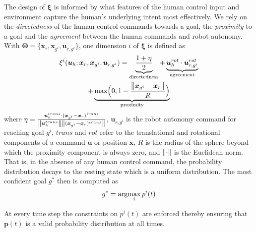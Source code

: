 The design of $\boldsymbol{\xi}$ is informed by what features of the human control input and environment capture the human's underlying intent most effectively. We rely on the \textit{directedness} of the human control commands towards a goal, the \textit{proximity} to a goal and the \textit{agreement} between the human commands and robot autonomy. 
With $\boldsymbol{\Theta} = \{\boldsymbol{x}_r, \boldsymbol{x}_{g^i}, \boldsymbol{u}_{r, g^i}\}$, one dimension $i$ of $\boldsymbol{\xi}$ is defined as 
\begin{multline*}
\xi^i(\boldsymbol{u}_h;\boldsymbol{x}_r, \boldsymbol{x}_{g^i}, \boldsymbol{u}_{r, g^i}) = \underbrace{\frac{1 + \eta}{2}}_{\text{directedness}} + \underbrace{\boldsymbol{u}_{h}^{rot}\cdot\boldsymbol{u}_{r,g^i}^{rot}}_{\text{agreement}}
\\+ \underbrace{\text{max}\Big(0, 1-\frac{\left\lVert\boldsymbol{x}_{g^i} - \boldsymbol{x}_r\right\rVert}{R}\Big)}_{\text{proximity}}
\end{multline*}
where  $\eta = \frac{\boldsymbol{u}_h^{trans}\cdot(\boldsymbol{x}_{g^i} - \boldsymbol{x}_r)^{trans}}{\left\lVert\boldsymbol{u}_h^{trans}\right\rVert\left\lVert(\boldsymbol{x}_{g^i} - \boldsymbol{x}_r)^{trans}\right\rVert}$, $\boldsymbol{u}_{r,g^i}$ is the robot autonomy command for reaching goal $g^i$, $trans$ and $rot$ refer to the translational and rotational components of a command $\boldsymbol{u}$ or position $\boldsymbol{x}$,  $R$ is the radius of the sphere beyond which the proximity component is always zero, and $\left\lVert\cdot\right\rVert$ is the Euclidean norm. That is, in the absence of any human control command, the probability distribution decays to the resting state which is a uniform distribution.  
The most confident goal $g^*$ then is computed as 
\begin{equation}
g^* = \arg\!\max_i  p^i(t)
\end{equation}

At every time step the constraints on $p^i(t)$ are enforced thereby ensuring that $\boldsymbol{p}(t)$ is a valid probability distribution at all times. 
	
